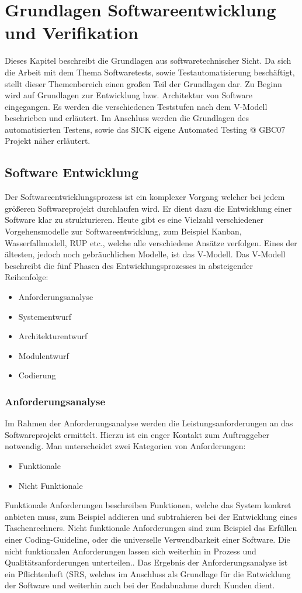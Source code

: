 \onehalfspacing
\section{Grundlagen Softwareentwicklung und Verifikation}
Dieses Kapitel beschreibt die Grundlagen aus softwaretechnischer Sicht. Da sich die Arbeit mit dem Thema Softwaretests, sowie Testautomatisierung beschäftigt, stellt dieser Themenbereich einen großen Teil der Grundlagen dar. Zu Beginn wird auf Grundlagen zur Entwicklung bzw. Architektur von Software eingegangen. Es werden die verschiedenen Teststufen nach dem V-Modell beschrieben und erläutert. Im Anschluss werden die Grundlagen des automatisierten Testens, sowie das SICK eigene Automated Testing @ GBC07 Projekt näher erläutert.
\subsection{Software Entwicklung} 
Der Softwareentwicklungsprozess ist ein komplexer Vorgang welcher bei jedem größeren Softwareprojekt durchlaufen wird. Er dient dazu die Entwicklung einer Software klar zu strukturieren.\cite{Prof.Dr.WolfgangSchramm.2020} Heute gibt es eine Vielzahl verschiedener Vorgehensmodelle zur Softwareentwicklung, zum Beispiel Kanban, Wasserfallmodell, RUP etc., welche alle verschiedene Ansätze verfolgen. Eines der ältesten, jedoch noch gebräuchlichen Modelle, ist das V-Modell.
Das V-Modell beschreibt die fünf Phasen des Entwicklungsprozesses in absteigender Reihenfolge:\cite{Spillner.2011}
\begin{itemize}
	\item Anforderungsanalyse
	\item Systementwurf
	\item Architekturentwurf
	\item Modulentwurf
	\item Codierung
\end{itemize}
\subsubsection{Anforderungsanalyse}
Im Rahmen der Anforderungsanalyse werden die Leistungsanforderungen an das Softwareprojekt ermittelt. Hierzu ist ein enger Kontakt zum Auftraggeber notwendig. Man unterscheidet zwei Kategorien von Anforderungen:
\begin{itemize}
	\item Funktionale
	\item Nicht Funktionale
\end{itemize}
Funktionale Anforderungen beschreiben Funktionen, welche das System konkret anbieten muss, zum Beispiel addieren und subtrahieren bei der Entwicklung eines Taschenrechners. Nicht funktionale Anforderungen sind zum Beispiel das Erfüllen einer Coding-Guideline, oder die universelle Verwendbarkeit einer Software. Die nicht funktionalen Anforderungen lassen sich weiterhin in Prozess und Qualitätsanforderungen unterteilen.\cite{Broy.2021}. Das Ergebnis der Anforderungsanalyse ist ein Pflichtenheft (\ac{SRS}, welches im Anschluss als Grundlage für die Entwicklung der Software und weiterhin auch bei der  Endabnahme durch Kunden dient.
